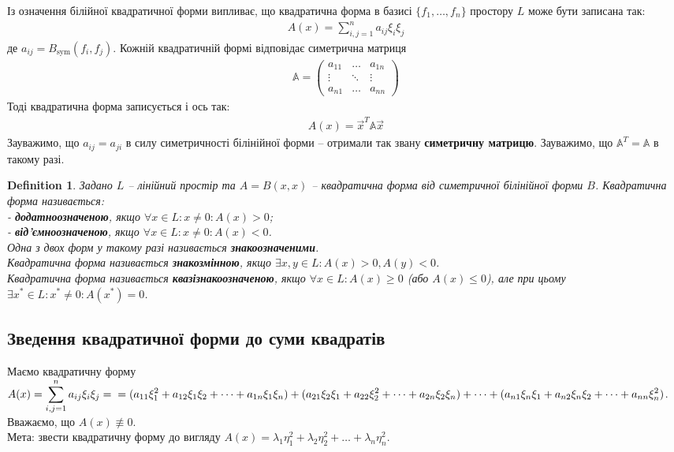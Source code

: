 \documentclass[a4paper, 10pt]{article}
\theoremstyle{theoremdd}
\newtheorem{definition}[theorem]{Definition}
\begin{document}
\noindent
Із означення білійної квадратичної форми випливає, що квадратична форма в базисі $\{f_1,\dots,f_n\}$ простору $L$ може бути записана так:
\begin{align*}
A(x) = \displaystyle\sum_{i,j=1}^n a_{ij} \xi_i \xi_j
\end{align*}
де $a_{ij} = B_{\text{sym}}(f_i,f_j)$. Кожній квадратичній формі відповідає симетрична матриця
\begin{align*}
\mathbb{A} = \begin{pmatrix}
a_{11} & \dots & a_{1n} \\
\vdots & \ddots & \vdots \\
a_{n1} & \dots & a_{nn}
\end{pmatrix}
\end{align*}
Тоді квадратична форма записується і ось так:
\begin{align*}
A(x) = \vec{x}^T \mathbb{A} \vec{x}
\end{align*}
\noindent
Зауважимо, що $a_{ij} = a_{ji}$ в силу симетричності білінійної форми -- отримали так звану \textbf{симетричну матрицю}. Зауважимо, що $\mathbb{A}^T = \mathbb{A}$ в такому разі.

\begin{definition}
Задано $L$ -- лінійний простір та $A = B(x,x)$ -- квадратична форма від симетричної білінійної форми $B$. Квадратична форма називається:\\
- \textbf{додатноозначеною}, якщо $\forall x \in L: x \neq 0: A(x) > 0$;\\
- \textbf{від'ємноозначеною}, якщо $\forall x \in L: x \neq 0: A(x) < 0$.\\
Одна з двох форм у такому разі називається \textbf{знакоозначеними}.
\bigskip \\
Квадратична форма називається \textbf{знакозмінною}, якщо $\exists x,y \in L: A(x) >0, A(y) < 0$.\\
Квадратична форма називається \textbf{квазізнакоозначеною}, якщо $\forall x \in L: A(x) \geq 0$ (або $A(x) \leq 0$), але при цьому $\exists x^* \in L: x^* \neq 0: A(x^*) = 0$.
\end{definition}

\subsection{Зведення квадратичної форми до суми квадратів}
Маємо квадратичну форму $A(x) = \displaystyle\sum_{i,j=1}^n a_{ij} \xi_i \xi_j = \\ = (a_{11}\xi_1^2 + a_{12}\xi_1\xi_2 + \dots + a_{1n}\xi_1 \xi_n) + (a_{21}\xi_2\xi_1 + a_{22}\xi_2^2 + \dots + a_{2n}\xi_2 \xi_n) + \dots + (a_{n1}\xi_n \xi_1 + a_{n2}\xi_n\xi_2 + \dots + a_{nn}\xi_n^2)$. Вважаємо, що $A(x) \not\equiv 0$. \\
Мета: звести квадратичну форму до вигляду $A(x) = \lambda_1 \eta_1^2 + \lambda_2 \eta_2^2 + \dots + \lambda_n \eta_n^2$.
\end{document}
